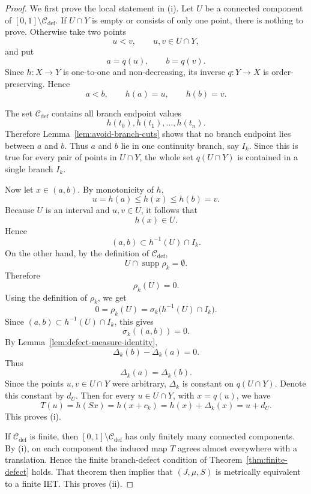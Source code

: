 \documentclass[11pt]{amsart}
\theoremstyle{plain}
\theoremstyle{definition}
\theoremstyle{remark}
\DeclareMathOperator{\supp}{supp}
\newcommand{\cC}{\mathcal C}
\begin{document}
\begin{proof}
We first prove the local statement in (i). Let \(U\) be a connected component of
\([0,1]\setminus \cC_{\mathrm{def}}\). If \(U\cap Y\) is empty or consists of only one point,
there is nothing to prove. Otherwise take two points
\[
        u<v, \qquad u,v\in U\cap Y,
\]
and put
\[
        a=q(u),\qquad b=q(v).
\]
Since \(h:X\to Y\) is one-to-one and non-decreasing, its inverse \(q:Y\to X\) is
order-preserving. Hence
\[
        a<b,\qquad h(a)=u,\qquad h(b)=v.
\]

The set \(\cC_{\mathrm{def}}\) contains all branch endpoint values
\[
        h(t_0),h(t_1),\ldots,h(t_n).
\]
Therefore Lemma~\ref{lem:avoid-branch-cuts} shows that no branch endpoint lies between
\(a\) and \(b\). Thus \(a\) and \(b\) lie in one continuity branch, say \(I_k\). Since this is
true for every pair of points in \(U\cap Y\), the whole set \(q(U\cap Y)\) is contained in a
single branch \(I_k\).

Now let \(x\in(a,b)\). By monotonicity of \(h\),
\[
        u=h(a)\leq h(x)\leq h(b)=v.
\]
Because \(U\) is an interval and \(u,v\in U\), it follows that
\[
        h(x)\in U.
\]
Hence
\[
        (a,b)\subset h^{-1}(U)\cap I_k.
\]
On the other hand, by the definition of \(\cC_{\mathrm{def}}\),
\[
        U\cap \supp\rho_k=\emptyset.
\]
Therefore
\[
        \rho_k(U)=0.
\]
Using the definition of \(\rho_k\), we get
\[
        0=\rho_k(U)=\sigma_k\bigl(h^{-1}(U)\cap I_k\bigr).
\]
Since \((a,b)\subset h^{-1}(U)\cap I_k\), this gives
\[
        \sigma_k((a,b))=0.
\]
By Lemma~\ref{lem:defect-measure-identity},
\[
        \Delta_k(b)-\Delta_k(a)=0.
\]
Thus
\[
        \Delta_k(a)=\Delta_k(b).
\]
Since the points \(u,v\in U\cap Y\) were arbitrary, \(\Delta_k\) is constant on
\(q(U\cap Y)\). Denote this constant by \(d_U\). Then for every \(u\in U\cap Y\), with
\(x=q(u)\), we have
\[
        T(u)=h(Sx)=h(x+c_k)=h(x)+\Delta_k(x)=u+d_U.
\]
This proves (i).

If \(\cC_{\mathrm{def}}\) is finite, then \([0,1]\setminus\cC_{\mathrm{def}}\) has only finitely
many connected components. By (i), on each component the induced map \(T\) agrees almost
everywhere with a translation. Hence the finite branch-defect condition of
Theorem~\ref{thm:finite-defect} holds. That theorem then implies that \((J,\mu,S)\) is
metrically equivalent to a finite IET. This proves (ii).


\end{proof}
\end{document}

